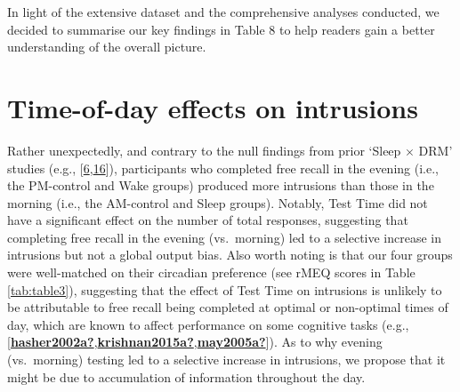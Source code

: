 \documentclass[
]{article}
\begin{document}
In light of the extensive dataset and the comprehensive analyses conducted, we decided to summarise our key findings in Table 8 to help readers gain a better understanding of the overall picture.

\hypertarget{time-of-day-effects-on-intrusions}{%
\section{Time-of-day effects on intrusions}\label{time-of-day-effects-on-intrusions}}

Rather unexpectedly, and contrary to the null findings from prior `Sleep \(\times\) DRM' studies (e.g., {[}\protect\hyperlink{ref-payne2009a}{6},\protect\hyperlink{ref-mckeon2012a}{16}{]}), participants who completed free recall in the evening (i.e., the PM-control and Wake groups) produced more intrusions than those in the morning (i.e., the AM-control and Sleep groups). Notably, Test Time did not have a significant effect on the number of total responses, suggesting that completing free recall in the evening (vs.~morning) led to a selective increase in intrusions but not a global output bias. Also worth noting is that our four groups were well-matched on their circadian preference (see rMEQ scores in Table \ref{tab:table3}), suggesting that the effect of Test Time on intrusions is unlikely to be attributable to free recall being completed at optimal or non-optimal times of day, which are known to affect performance on some cognitive tasks (e.g., {[}\protect\hyperlink{ref-hasher2002a}{\textbf{hasher2002a?}},\protect\hyperlink{ref-krishnan2015a}{\textbf{krishnan2015a?}},\protect\hyperlink{ref-may2005a}{\textbf{may2005a?}}{]}). As to why evening (vs.~morning) testing led to a selective increase in intrusions, we propose that it might be due to accumulation of information throughout the day.
\end{document}
